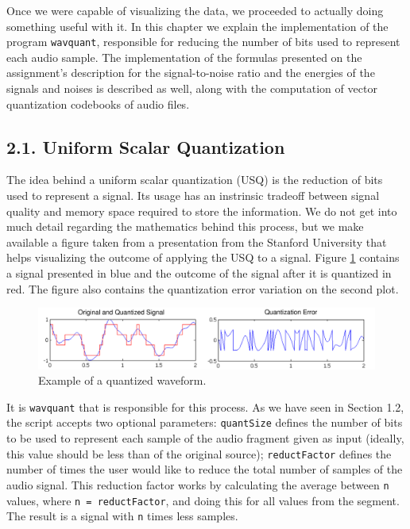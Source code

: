 \documentclass[12pt]{article}
\begin{document}
Once we were capable of visualizing the data, we proceeded to actually doing 
something useful with it.
In this chapter we explain the implementation of the program \texttt{wavquant},
responsible for reducing the number of bits used to represent each audio sample.
The implementation of the formulas presented on the assignment's description for
the signal-to-noise ratio and the energies of the signals and noises is described
as well, along with the computation of vector quantization codebooks of audio files.

\subsection*{2.1. Uniform Scalar Quantization}

The idea behind a uniform scalar quantization (USQ) is the reduction of bits 
used to represent a signal.
Its usage has an instrinsic tradeoff between signal quality and memory space
required to store the information.
We do not get into much detail regarding the mathematics behind this process, 
but we make available a figure taken from a presentation from the Stanford 
University \cite{stanford} that helps visualizing the outcome of applying the 
USQ to a signal.
Figure \ref{fig:quantization} contains a signal presented in blue and the outcome
of the signal after it is quantized in red. 
The figure also contains the quantization error variation on
the second plot.

\begin{figure}[H]
  \centering
  \begin{minipage}{\textwidth}
    \centering
    \includegraphics[width=\linewidth]{stanford_quantization_wide.png}
  \end{minipage}%
  \caption{Example of a quantized waveform.}
  \label{fig:quantization}
\end{figure}

It is \texttt{wavquant} that is responsible for this process.
As we have seen in Section 1.2, the script accepts two optional parameters:
\texttt{quantSize} defines the number of bits to be used to represent each sample of the audio 
fragment given as input (ideally, this value should be less than of the original 
source); \texttt{reductFactor} defines the number of times the user would like 
to reduce the total number of samples of the audio signal.
This reduction factor works by calculating the average between \texttt{n} values, 
where \texttt{n = reductFactor}, and doing this for all values from the segment.
The result is a signal with \texttt{n} times less samples.
\end{document}
